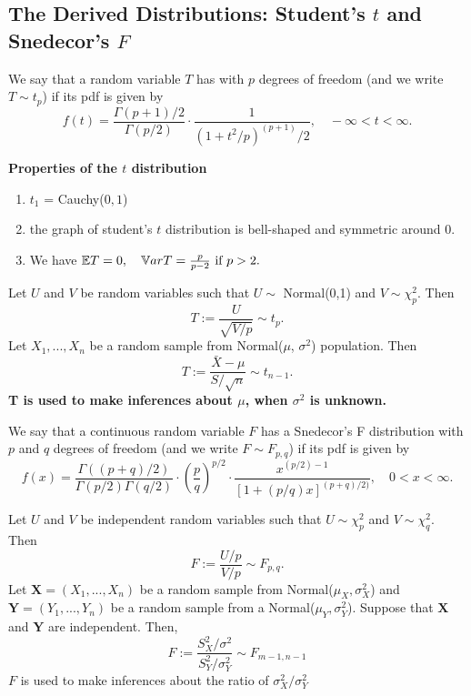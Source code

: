 \subsection{The Derived Distributions: Student’s $t$ and Snedecor’s $F$}
\begin{definition}
We say that a random variable $T$ has  with $p$ degrees of freedom (and we write $T \sim t_p$) if its pdf is given by
$$
f(t) = \frac{\Gamma(p+1)/2}{\Gamma(p/2)} \cdot
\frac{1}{(1+t^2/p)^(p+1)/2}, \quad -\infty < t < \infty.
$$
\end{definition}
\textbf{Properties of the $t$ distribution}
\begin{enumerate}
    \item $t_1$ = Cauchy($0,1$)
    \item the graph of student's $t$ distribution is bell-shaped and symmetric around 0.
    \item We have
    $
    \mathbb E T = 0, \quad \mathbb V ar T = \frac{p}{p-2} \text{ if } p >2.
    $
\end{enumerate}
Let $U$ and $V$ be random variables such that $U \sim $ Normal(0,1) and $V \sim \chi_p^2$. Then
$$
T := \frac{U}{\sqrt{V/p}} \sim t_p.
$$
 Let $X_1,...,X_n$ be a random sample from Normal($\mu$, $\sigma^2$) population. Then
$$
T := \frac{\bar{X} - \mu}{S / \sqrt{n}} \sim t_{n-1}.
$$
\textbf{T is used to make inferences about $\mu$, when $\sigma^2$ is unknown.}
\begin{definition}
We say that a continuous random variable $F$ has a Snedecor’s F distribution with $p$ and $q$ degrees of freedom (and we write $F \sim F_{p,q}$) if its pdf is given by
$$
f(x) = \frac{\Gamma((p+q)/2)}{\Gamma(p/2)\Gamma(q/2)} \cdot \left( 
\frac{p}{q}
\right)^{p/2} \cdot
\frac{x^{(p/2)-1}}{[1+(p/q)x]^{(p+q)/2)}}, \quad 0 < x < \infty.
$$
\end{definition}
Let $U$ and $V$ be independent random variables such that $U \sim \chi_{p}^2$ and $V \sim \chi_{q}^2$. Then
$$
F := \frac{U/p}{V/p} \sim F_{p,q}.
$$
 Let $\boldsymbol{X} = (X_1,...,X_n)$ be a random sample from Normal($\mu_X, \sigma_X^2$) and $\boldsymbol{Y} = (Y_1,...,Y_n)$ be a random sample from a Normal($\mu_Y,\sigma_{Y}^2$). Suppose that $\boldsymbol{X}$ and $\boldsymbol{Y}$ are independent. Then,
$$
F := \frac{S_{X}^2/ \sigma^2}{S_{Y}^2/ \sigma^2_Y} \sim F_{m-1,n-1}
$$
$F$ is used to make inferences about the ratio of $\sigma_{X}^2 / \sigma_{Y}^2 $
